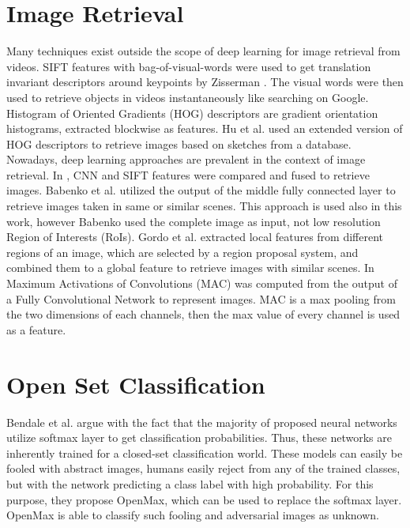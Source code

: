 \section{Image Retrieval}
Many techniques exist outside the scope of deep learning for image retrieval from videos. SIFT features \cite{Lowe:2004:DIF:993451.996342} with bag-of-visual-words were used to get translation invariant descriptors around keypoints by Zisserman \cite{Sivic:2003:VGT:946247.946751}. The visual words were then used to retrieve objects in videos instantaneously like searching on Google. Histogram of Oriented Gradients (HOG) \cite{Dalal:2005:HOG:1068507.1069007} descriptors are gradient orientation histograms, extracted blockwise as features. Hu et al. \cite{Hu:2013:PEG:2479988.2480107} used an extended version of HOG descriptors to retrieve images based on sketches from a database. Nowadays, deep learning approaches are prevalent in the context of image retrieval. In \cite{Yan:2016:CVS:2964284.2967252}, CNN and SIFT features were compared and fused to retrieve images. Babenko et al. \cite{DBLP:journals/corr/BabenkoSCL14} utilized the output of the middle fully connected layer to retrieve images taken in same or similar scenes. This approach is used also in this work, however Babenko used the complete image as input, not low resolution Region of Interests (RoIs). Gordo et al. \cite{DBLP:journals/corr/GordoARL16} extracted local features from different regions of an image, which are selected by a region proposal system, and combined them to a global feature to retrieve images with similar scenes. In \cite{DBLP:journals/corr/RadenovicTC16} Maximum Activations of Convolutions (MAC) was computed from the output of a Fully Convolutional Network to represent images. MAC is a max pooling from the two dimensions of each channels, then the max value of every channel is used as a feature.
\section{Open Set Classification}
Bendale et al. argue \cite{DBLP:journals/corr/BendaleB15} with the fact that the majority of proposed neural networks utilize softmax layer to get classification probabilities. Thus, these networks are inherently trained for a closed-set classification world. These models can easily be fooled with abstract images, humans easily reject from any of the trained classes, but with the network predicting a class label with high probability. For this purpose, they propose OpenMax, which can be used to replace the softmax layer. OpenMax is able to classify such fooling and adversarial images as unknown.

